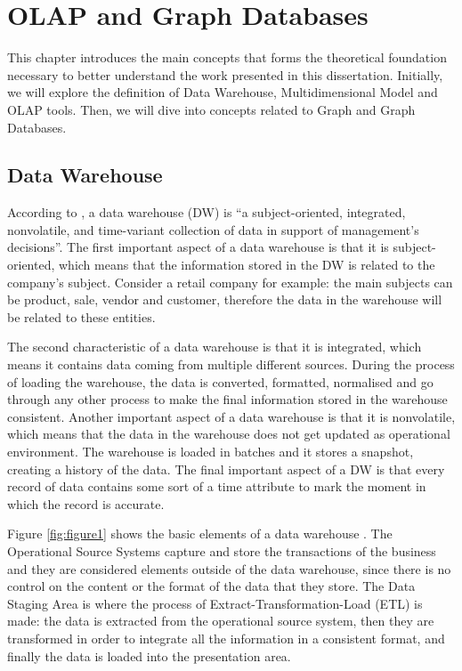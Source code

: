 \chapter{OLAP and Graph Databases}
This chapter introduces the main concepts that forms the theoretical foundation necessary to better understand the work presented in this dissertation. Initially, we will explore the definition of Data Warehouse, Multidimensional Model and OLAP tools. Then, we will dive into concepts related to Graph and Graph Databases.

\section{Data Warehouse}
According to \cite{Inmon2005}, a data warehouse (DW) is ``a subject-oriented, integrated, nonvolatile, and time-variant collection of data in support of management's decisions''. The first important aspect of a data warehouse is that it is subject-oriented, which means that the information stored in the DW is related to the company's subject. Consider a retail company for example: the main subjects can be product, sale, vendor and customer, therefore the data in the warehouse will be related to these entities.
 
The second characteristic of a data warehouse is that it is integrated, which means it contains data coming from multiple different sources. During the process of loading the warehouse, the data is converted, formatted, normalised and go through any other process to make the final information stored in the warehouse consistent. Another important aspect of a data warehouse is that it is nonvolatile, which means that the data in the warehouse does not get updated as operational environment. The warehouse is loaded in batches and it stores a snapshot, creating a history of the data. The final important aspect of a DW is that every record of data contains some sort of a time attribute to mark the moment in which the record is accurate.
 
Figure \ref{fig:figure1} shows the basic elements of a data warehouse \cite{Kimball2011}. The Operational Source Systems capture and store the transactions of the business and they are considered elements outside of the data warehouse, since there is no control on the content or the format of the data that they store. The Data Staging Area is where the process of Extract-Transformation-Load (ETL) is made: the data is extracted from the operational source system, then they are transformed in order to integrate all the information in a consistent format, and finally the data is loaded into the presentation area.

